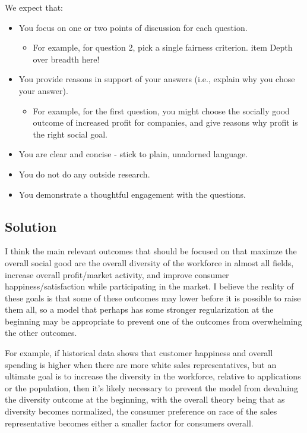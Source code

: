 \documentclass[submit]{harvardml}
\begin{document}
\begin{problem}
We expect that:
\begin{itemize}
\item You focus on one or two points of discussion for each question.
\begin{itemize}
\item For example, for question 2, pick a single fairness criterion.
item Depth over breadth here!
\end{itemize}
\item You provide reasons in support of your answers (i.e., explain why you chose your answer).
\begin{itemize}
\item For example, for the first question, you might choose the socially good outcome of increased profit for companies, and give reasons why profit is the right social goal.
\end{itemize}
\item You are clear and concise - stick to plain, unadorned language.
\item You do not do any outside research.
\item You demonstrate a thoughtful engagement with the questions.
\end{itemize}


\end{problem}

\subsection*{Solution}

I think the main relevant outcomes that should be focused on that maximze the
overall social good are the overall diversity of the workforce in almost all
fields, increase overall profit/market activity, and improve consumer
happiness/satisfaction while participating in the market. I believe the reality
of these goals is that some of these outcomes may lower before it is possible
to raise them all, so a model that perhaps has some stronger regularization at
the beginning may be appropriate to prevent one of the outcomes from
overwhelming the other outcomes.

For example, if historical data shows that customer happiness and overall
spending is higher when there are more white sales representatives, but an
ultimate goal is to increase the diversity in the workforce, relative to
applications or the population, then it's likely necessary to prevent the model
from devaluing the diversity outcome at the beginning, with the overall theory
being that as diversity becomes normalized, the consumer preference on race of
the sales representative becomes either a smaller factor for consumers overall.
\end{document}

